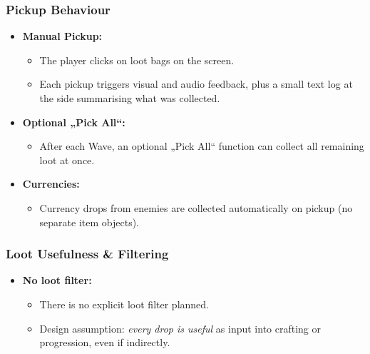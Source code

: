 \subsubsection*{Pickup Behaviour}

\begin{itemize}
	\item \textbf{Manual Pickup:}
	\begin{itemize}
		\item The player clicks on loot bags on the screen.
		\item Each pickup triggers visual and audio feedback, plus a small text log at the side summarising what was collected.
	\end{itemize}
	\item \textbf{Optional „Pick All“:}
	\begin{itemize}
		\item After each Wave, an optional „Pick All“ function can collect all remaining loot at once.
	\end{itemize}
	\item \textbf{Currencies:}
	\begin{itemize}
		\item Currency drops from enemies are collected automatically on pickup (no separate item objects).
	\end{itemize}
\end{itemize}

\subsubsection*{Loot Usefulness \& Filtering}

\begin{itemize}
	\item \textbf{No loot filter:}
	\begin{itemize}
		\item There is no explicit loot filter planned.
		\item Design assumption: \emph{every drop is useful} as input into crafting or progression, even if indirectly.
	\end{itemize}
\end{itemize}


